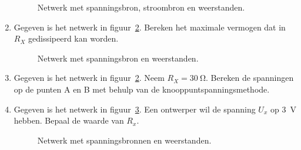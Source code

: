 \begin{enumerate}[labelindent=0pt,labelwidth=\widthof{8.88.\ },label=\textbf{\thechapter.\arabic*.},leftmargin=!,ref=\thechapter.\arabic*]
\begin{figure}[!ht]
\centering
{}
\caption{Netwerk met spanningsbron, stroombron en weerstanden.}
\label{fig:gelsuperpos1}
\end{figure}



\item
\label{que:gelthevenin3}
Gegeven is het netwerk in figuur~\ref{fig:gelnetwerkvoortheveninanalysis3}. Bereken het maximale vermogen dat in $R_X$ gedissipeerd kan worden.

\begin{figure}[!ht]
\centering
{}
\caption{Netwerk met spanningsbron en weerstanden.}
\label{fig:gelnetwerkvoortheveninanalysis3}
\end{figure}

\item
\label{que:gelnodal1}
Gegeven is het netwerk in figuur~\ref{fig:gelnetwerkvoortheveninanalysis3}. Neem $R_X=\SI{30}{\ohm}$. Bereken de spanningen op de punten A en B met behulp van de knooppuntspanningsmethode.


\item
\label{que:gelnodal2}
Gegeven is het netwerk in figuur~\ref{fig:gelnodal2}. Een ontwerper wil de spanning $U_x$ op \SI{3}{\volt} hebben.
Bepaal de waarde van $R_x$.

\begin{figure}[!ht]
\centering
{}
\caption{Netwerk met spanningsbronnen en weerstanden.}
\label{fig:gelnodal2}
\end{figure}


\end{enumerate}

